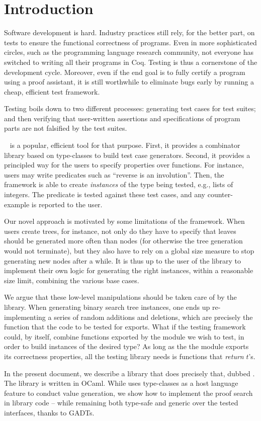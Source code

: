 \section{Introduction}
\label{sec:introduction}

Software development is hard. Industry practices still rely, for the better
part, on tests to ensure the functional correctness of programs. Even in more
sophisticated circles, such as the programming language research community, not
everyone has switched to writing all their programs in Coq. Testing is thus a
cornerstone of the development cycle. Moreover, even if the end goal is to fully
certify a program using a proof assistant, it is still worthwhile to eliminate
bugs early by running a cheap, efficient test framework.


Testing boils down to two different processes: generating test cases
for test suites; and then verifying that user-written assertions and
specifications of program parts are not falsified by the test suites.

\qcheck{}~\cite{DBLP:conf/icfp/ClaessenH00} is a popular, efficient
tool for that purpose. First, it provides a combinator library based
on type-classes to build test case generators. Second, it provides
a principled way for the users to specify properties over
functions. For instance, users may write predicates such as ``reverse
is an involution''. Then, the \qcheck framework is able to create
\emph{instances} of the type being tested, e.g., lists of integers.
The predicate is tested against these test cases, and any
counter-example is reported to the user.

Our novel approach is motivated by some limitations of the \qcheck
framework.  When users create trees, for instance, not only do they
have to specify that leaves should be generated more often than nodes
(for otherwise the tree generation would not terminate), but they also
have to rely on a global size measure to stop generating new nodes
after a while. It is thus up to the user of the library to implement
their own logic for generating the right instances, within a
reasonable size limit, combining the various base cases.

We argue that these low-level manipulations should be taken care of by the
library. When generating binary search tree instances, one ends up
re-implementing a series of random additions and deletions, which are precisely
the function that the code to be tested for exports. What if the testing
framework could, by itself, combine functions exported by the module we wish to
test, in order to build instances of the desired type? As long as the the module
exports its correctness properties, all the testing library needs is functions
that \emph{return} $t$'s.

In the present document, we describe a library that does precisely
that, dubbed \arti. The library is written in OCaml. While \qcheck
uses type-classes as a host language feature to conduct value
generation, we show how to implement the proof search in library
code -- while remaining both type-safe and generic over the
tested interfaces, thanks to GADTs.
